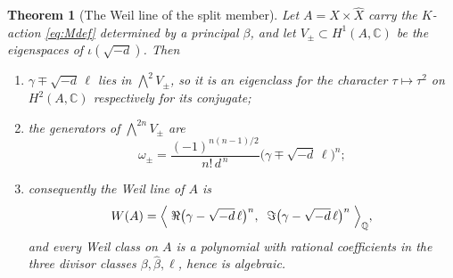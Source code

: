 \documentclass[11pt,reqno]{amsart}
\theoremstyle{plain}
\newtheorem{theorem}{Theorem}[section]
\theoremstyle{definition}
\theoremstyle{remark}
\newcommand{\QQ}{\mathbb{Q}}
\newcommand{\CC}{\mathbb{C}}
\newcommand{\HW}{W}                      %
\begin{document}
\begin{theorem}[The Weil line of the split member]\label{thm:splitclosed}
Let $A=X\times\widehat{X}$ carry the $K$-action \eqref{eq:Mdef} determined by a
principal $\beta$, and let $V_{\pm}\subset H^{1}(A,\CC)$ be the eigenspaces of
$\iota(\sqrt{-d})$. Then
\begin{enumerate}[label=\textup{(\roman*)},nosep]
\item $\gamma\mp\sqrt{-d}\,\ell$ lies in $\bigwedge^{2}V_{\pm}$, so it is an
  eigenclass for the character $\tau\mapsto\tau^{2}$ on $H^{2}(A,\CC)$
  respectively for its conjugate;
\item the generators of $\bigwedge^{2n}V_{\pm}$ are
  \begin{equation}\label{eq:splitclosed}
    \omega_{\pm}
    =\frac{(-1)^{n(n-1)/2}}{n!\,d^{\,n}}
      \bigl(\gamma\mp\sqrt{-d}\,\ell\bigr)^{n};
  \end{equation}
\item consequently the Weil line of $A$ is
  \[
    \HW(A)=\Bigl\langle\;
      \Re\bigl(\gamma-\sqrt{-d}\,\ell\bigr)^{n},\;\;
      \Im\bigl(\gamma-\sqrt{-d}\,\ell\bigr)^{n}
    \;\Bigr\rangle_{\QQ},
  \]
  and every Weil class on $A$ is a polynomial with rational coefficients in
  the three divisor classes $\beta,\widehat{\beta},\ell$, hence is algebraic.
\end{enumerate}
\end{theorem}
\end{document}

